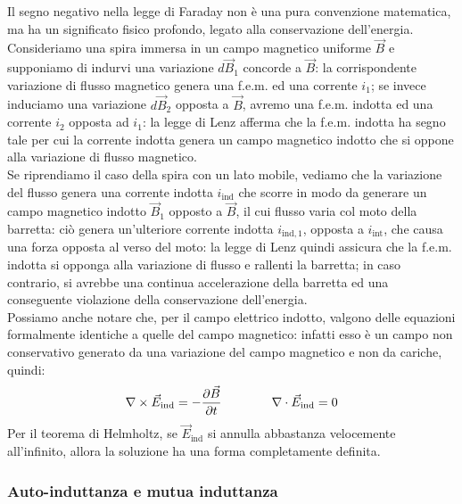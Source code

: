 Il segno negativo nella legge di Faraday non è una pura convenzione matematica, ma ha un significato fisico profondo, legato alla conservazione dell'energia. \\ 
%
Consideriamo una spira immersa in un campo magnetico uniforme $ \vec{B} $ e supponiamo di indurvi una variazione $ d\vec{B}_1 $ concorde a $ \vec{B} $: la corrispondente variazione di flusso magnetico genera una f.e.m. ed una corrente $ i_1 $; se invece induciamo una variazione $ d\vec{B}_2 $ opposta a $ \vec{B} $, avremo una f.e.m. indotta ed una corrente $ i_2 $ opposta ad $ i_1 $: la legge di Lenz afferma che la f.e.m. indotta ha segno tale per cui la corrente indotta genera un campo magnetico indotto che si oppone alla variazione di flusso magnetico. \\ 
%
Se riprendiamo il caso della spira con un lato mobile, vediamo che la variazione del flusso genera una corrente indotta $ i_{\text{ind}} $ che scorre in modo da generare un campo magnetico indotto $ \vec{B}_1 $ opposto a $ \vec{B} $, il cui flusso varia col moto della barretta: ciò genera un'ulteriore corrente indotta $ i_{\text{ind},1} $, opposta a $ i_{\text{int}} $, che causa una forza opposta al verso del moto: la legge di Lenz quindi assicura che la f.e.m. indotta si opponga alla variazione di flusso e rallenti la barretta; in caso contrario, si avrebbe una continua accelerazione della barretta ed una conseguente violazione della conservazione dell'energia. \\ 
%
Possiamo anche notare che, per il campo elettrico indotto, valgono delle equazioni formalmente identiche a quelle del campo magnetico: infatti esso è un campo non conservativo generato da una variazione del campo magnetico e non da cariche, quindi:
\begin{equation}
	\nabla\times\vec{E}_{\text{ind}} = -\frac{\partial\vec{B}}{\partial t} \qquad\qquad \nabla\cdot\vec{E}_{\text{ind}} = 0
	\label{eq:16}
\end{equation}
Per il teorema di Helmholtz, se $ \vec{E}_{\text{ind}} $ si annulla abbastanza velocemente all'infinito, allora la soluzione ha una forma completamente definita.

\subsubsection{Auto-induttanza e mutua induttanza}

